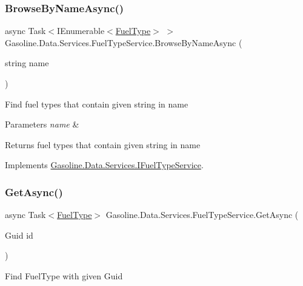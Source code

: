 \subsubsection{\texorpdfstring{BrowseByNameAsync()}{BrowseByNameAsync()}}
{\footnotesize\ttfamily async Task$<$I\+Enumerable$<$\mbox{\hyperlink{class_gasoline_1_1_data_1_1_models_1_1_fuel_type}{Fuel\+Type}}$>$ $>$ Gasoline.\+Data.\+Services.\+Fuel\+Type\+Service.\+Browse\+By\+Name\+Async (\begin{DoxyParamCaption}\item[{string}]{name }\end{DoxyParamCaption})}



Find fuel types that contain given string in name 


\begin{DoxyParams}{Parameters}
{\em name} & \\
\hline
\end{DoxyParams}
\begin{DoxyReturn}{Returns}
fuel types that contain given string in name
\end{DoxyReturn}


Implements \mbox{\hyperlink{interface_gasoline_1_1_data_1_1_services_1_1_i_fuel_type_service_a3641a00f790e0aabb9decc8e9a5e7dc9}{Gasoline.\+Data.\+Services.\+I\+Fuel\+Type\+Service}}.

\mbox{\label{class_gasoline_1_1_data_1_1_services_1_1_fuel_type_service_a9993b394d47b8cb7712fc526bf36e3e0}} 
\subsubsection{\texorpdfstring{GetAsync()}{GetAsync()}}
{\footnotesize\ttfamily async Task$<$\mbox{\hyperlink{class_gasoline_1_1_data_1_1_models_1_1_fuel_type}{Fuel\+Type}}$>$ Gasoline.\+Data.\+Services.\+Fuel\+Type\+Service.\+Get\+Async (\begin{DoxyParamCaption}\item[{Guid}]{id }\end{DoxyParamCaption})}



Find Fuel\+Type with given Guid 


